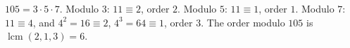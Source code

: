 $105=3\cdot5\cdot7$. Modulo $3$: $11\equiv2$, order $2$. Modulo $5$: $11\equiv1$, order $1$. Modulo $7$: $11\equiv4$, and $4^2=16\equiv2$, $4^3=64\equiv1$, order $3$. The order modulo $105$ is $\operatorname{lcm}(2,1,3)=\boxed{6}$.

